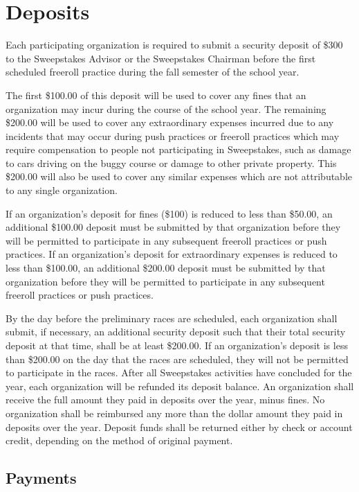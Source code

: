 \section{Deposits}
\label{Deposits}

	Each participating organization is required to submit a security deposit of \$300 to the Sweepstakes Advisor or the Sweepstakes Chairman before the first scheduled freeroll practice during the fall semester of the school year.

	The first \$100.00 of this deposit will be used to cover any fines that an organization may incur during the course of the school year. The remaining \$200.00 will be used to cover any extraordinary expenses incurred due to any incidents that may occur during push practices or freeroll practices which may require compensation to people not participating in Sweepstakes, such as damage to cars driving on the buggy course or damage to other private property. This \$200.00 will also be used to cover any similar expenses which are not attributable to any single organization.

	If an organization's deposit for fines (\$100) is reduced to less than \$50.00, an additional \$100.00 deposit must be submitted by that organization before they will be permitted to participate in any subsequent freeroll practices or push practices. If an organization's deposit for extraordinary expenses is reduced to less than \$100.00, an additional \$200.00 deposit must be submitted by that organization before they will be permitted to participate in any subsequent freeroll practices or push practices.

	By the day before the preliminary races are scheduled, each organization shall submit, if necessary, an additional security deposit such that their total security deposit at that time, shall be at least \$200.00. If an organization's deposit is less than \$200.00 on the day that the races are scheduled, they will not be permitted to participate in the races. After all Sweepstakes activities have concluded for the year, each organization will be refunded its deposit balance. An organization shall receive the full amount they paid in deposits over the year, minus fines. No organization shall be reimbursed any more than the dollar amount they paid in deposits over the year. Deposit funds shall be returned either by check or account credit, depending on the method of original payment.

\subsection{Payments}

